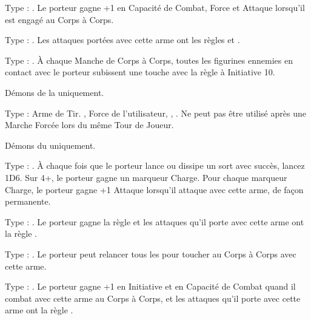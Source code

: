 \begin{multicols}{2}\raggedcolumns

\subtitle{Armes Démoniaques}\vspace{5pt}

\startpricelist

Type : \hw{}. Le porteur gagne +1 en Capacité de Combat, Force et Attaque lorsqu'il est engagé au Corps à Corps.

Type : \hw{}. Les attaques portées avec cette arme ont les règles  et .

Type : \hw{}. À chaque Manche de Corps à Corps, toutes les figurines ennemies en contact avec le porteur subissent une touche avec la règle \toxicattacks{} à Initiative 10.

Démons de la \textbf{\dlust} uniquement.

Type : Arme de Tir. , Force de l'utilisateur, , \quicktofire{}. Ne peut pas être utilisé après une Marche Forcée lors du même Tour de Joueur.

Démons du \textbf{\dchange} uniquement.

Type : \hw{}. À chaque fois que le porteur lance ou dissipe un sort avec succès, lancez 1D6. Sur 4+, le porteur gagne un marqueur Charge. Pour chaque marqueur Charge, le porteur gagne +1 Attaque lorsqu'il attaque avec cette arme, de façon permanente.

Type : \hw{}. Le porteur gagne la règle \fear{} et les attaques qu'il porte avec cette arme ont la règle \divineattacks{}.

Type : \hw{}. Le porteur peut relancer tous les  pour toucher au Corps à Corps avec cette arme.

\columnbreak\vspace*{-0.1cm}
Type : \hw{}. Le porteur gagne +1 en Initiative et en Capacité de Combat quand il combat avec cette arme au Corps à Corps, et les attaques qu'il porte avec cette arme ont la règle .

\endpricelist

\subtitle{Talismans démoniaques}\vspace{5pt}

\startpricelist


\end{multicols}

